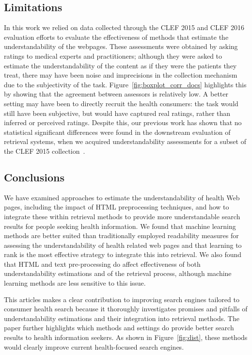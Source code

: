 \subsection*{Limitations}
In this work we relied on data collected through the CLEF 2015 and CLEF 2016 evaluation efforts to evaluate the effectiveness of methods that estimate the understandability of the webpages. These assessments were obtained by asking ratings to medical experts and practitioners; although they were asked to estimate the understandability of the content as if they were the patients they treat, there may have been noise and imprecisions in the collection mechanism due to the subjectivity of the task. Figure~\ref{fig:boxplot_corr_docs} highlights this by showing that the agreement between assessors is relatively low. A better setting may have been to directly recruit the health consumers: the task would still have been subjective, but would have captured real ratings, rather than inferred or perceived ratings. Despite this, our previous work has shown that no statistical significant differences were found in the downstream evaluation of retrieval systems, when we acquired understandability assessments for a subset of the CLEF 2015 collection~\cite{palotti16b}. 


\subsection*{Conclusions}

We have examined approaches to estimate the understandability of health Web pages, including the impact of HTML preprocessing techniques, and how to integrate these within retrieval methods to provide more understandable search results for people seeking health information. We found that machine learning methods are better suited than traditionally employed readability measures for assessing the understandability of health related web pages and that learning to rank is the most effective strategy to integrate this into retrieval. We also found that HTML and text pre-processing do affect effectiveness of both understandability estimations and of the retrieval process, although machine learning methods are less sensitive to this issue.

This articles makes a clear contribution to improving search engines tailored to consumer health search because it thoroughly investigates promises and pitfalls of understandability estimations and their integration into retrieval methods. The paper further highlights which methods and settings do provide better search results to health information seekers. As shown in Figure~\ref{fig:dist}, these methods would clearly improve current health-focused search engines. 
